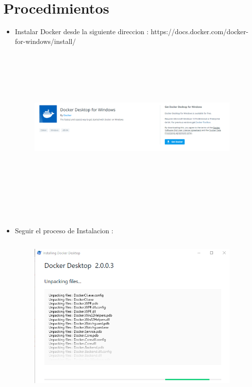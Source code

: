 \section{Procedimientos} 

\begin{itemize}
\subsection{Instalacion de Docker}
	

	\item Instalar Docker desde la siguiente direccion :
	https://docs.docker.com/docker-for-windows/install/
	\begin{figure}[htb]
	\begin{center}
	\includegraphics[width=18cm, height=8cm]{./Imagenes/docker}
	\end{center}
	\end{figure}\\
	
	\item Seguir el proceso de Instalacion :\\
	\begin{figure}[htb]
	\begin{center}
	\includegraphics[width=18cm, height=8cm]{./Imagenes/dockerinst}
	\end{center}
	\end{figure}\\
	

\end{itemize}
